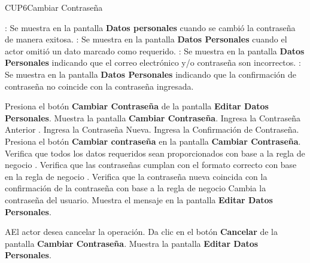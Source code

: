 \begin{UseCase}{CUP6}{Cambiar Contraseña}
{\begin{UClist}
	    \UCli {}: Se muestra en la pantalla \textbf{Datos personales} cuando se cambió la contraseña de manera exitosa.
	    \UCli {}: Se muestra en la pantalla \textbf{Datos Personales} cuando el actor omitió un dato marcado como requerido.
		\UCli {}: Se muestra en la pantalla \textbf{Datos Personales} indicando que el correo electrónico y/o contraseña son incorrectos.
		\UCli {}: Se muestra en la pantalla \textbf{Datos Personales} indicando que la confirmación de contraseña no coincide con la contraseña ingresada.
		
	    \end{UClist}
	}
 \end{UseCase}

 \begin{UCtrayectoria}
 	
 	\UCpaso [\UCactor] Presiona el botón \textbf{Cambiar Contraseña} de la pantalla \textbf{Editar Datos Personales}.
 	\UCpaso Muestra la pantalla \textbf{Cambiar Contraseña}.
 	\UCpaso [\UCactor] Ingresa la Contraseña Anterior . \label{contra}
 	\UCpaso [\UCactor] Ingresa la Contraseña Nueva.
 	\UCpaso [\UCactor]Ingresa la Confirmación de Contraseña.
 	\UCpaso [\UCactor] Presiona el botón \textbf{Cambiar contraseña} en la pantalla \textbf{Cambiar Contraseña}.
 	\UCpaso Verifica que todos los datos requeridos sean proporcionados con base a la regla de negocio .
 	\UCpaso Verifica que las contraseñas cumplan con el formato correcto con base en la regla de negocio .
 	\UCpaso Verifica que la contraseña nueva coincida con la confirmación de la contraseña con base a la regla de negocio 
 	\UCpaso Cambia la contraseña del usuario.
 	\UCpaso Muestra el mensaje  en la pantalla \textbf{Editar Datos Personales}.
     
 \end{UCtrayectoria}

 \begin{UCtrayectoriaA}{A}{El actor desea cancelar la operación.}
 	\UCpaso [\UCactor] Da clic en el botón \textbf{Cancelar} de la pantalla \textbf{Cambiar Contraseña}.
 	\UCpaso Muestra la pantalla \textbf{Editar Datos Personales}.
    
 \end{UCtrayectoriaA}

